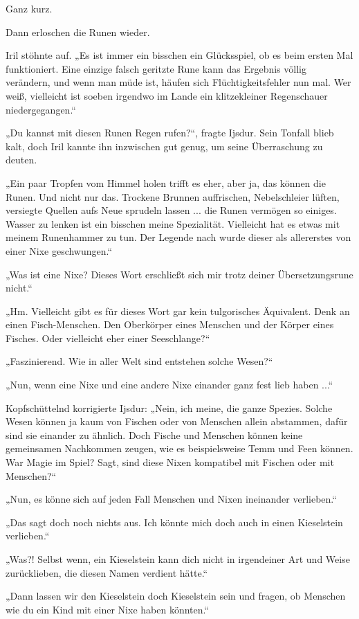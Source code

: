 Ganz kurz.

Dann erloschen die Runen wieder.

Iril stöhnte auf. „Es ist immer ein bisschen ein Glücksspiel, ob es beim ersten Mal funktioniert. Eine einzige falsch geritzte Rune kann das Ergebnis völlig verändern, und wenn man müde ist, häufen sich Flüchtigkeitsfehler nun mal. Wer weiß, vielleicht ist soeben irgendwo im Lande ein klitzekleiner Regenschauer niedergegangen.“

„Du kannst mit diesen Runen Regen rufen?“, fragte Ijsdur. Sein Tonfall blieb kalt, doch Iril kannte ihn inzwischen gut genug, um seine Überraschung zu deuten.

„Ein paar Tropfen vom Himmel holen trifft es eher, aber ja, das können die Runen. Und nicht nur das. Trockene Brunnen auffrischen, Nebelschleier lüften, versiegte Quellen aufs Neue sprudeln lassen ... die Runen vermögen so einiges. Wasser zu lenken ist ein bisschen meine Spezialität. Vielleicht hat es etwas mit meinem Runenhammer zu tun. Der Legende nach wurde dieser als allererstes von einer Nixe geschwungen.“

„Was ist eine Nixe? Dieses Wort erschließt sich mir trotz deiner Übersetzungsrune nicht.“

„Hm. Vielleicht gibt es für dieses Wort gar kein tulgorisches Äquivalent. Denk an einen Fisch-Menschen. Den Oberkörper eines Menschen und der Körper eines Fisches. Oder vielleicht eher einer Seeschlange?“

„Faszinierend. Wie in aller Welt sind entstehen solche Wesen?“

„Nun, wenn eine Nixe und eine andere Nixe einander ganz fest lieb haben ...“

Kopfschüttelnd korrigierte Ijsdur: „Nein, ich meine, die ganze Spezies. Solche Wesen können ja kaum von Fischen oder von Menschen allein abstammen, dafür sind sie einander zu ähnlich. Doch Fische und Menschen können keine gemeinsamen Nachkommen zeugen, wie es beispielsweise Temm und Feen können. War Magie im Spiel? Sagt, sind diese Nixen kompatibel mit Fischen oder mit Menschen?“

„Nun, es könne sich auf jeden Fall Menschen und Nixen ineinander verlieben.“

„Das sagt doch noch nichts aus. Ich könnte mich doch auch in einen Kieselstein verlieben.“

„Was?! Selbst wenn, ein Kieselstein kann dich nicht in irgendeiner Art und Weise zurücklieben, die diesen Namen verdient hätte.“

„Dann lassen wir den Kieselstein doch Kieselstein sein und fragen, ob Menschen wie du ein Kind mit einer Nixe haben könnten.“

